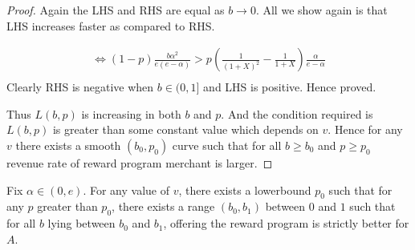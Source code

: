 \begin{proof}
Again the LHS and RHS are equal as $b\rightarrow 0$. All we show again is that LHS increases faster as compared to RHS.

\begin{align*}
\Leftrightarrow (1-p)\frac{b\alpha^2}{e(e-\alpha)} > p\left(\frac{1}{(1+X)^2} - \frac{1}{1+X} \right)\frac{\alpha}{e-\alpha}\\
\end{align*}
Clearly RHS is negative when $b\in (0,1]$ and LHS is positive. Hence proved.

Thus $L(b,p)$ is increasing in both $b$ and $p$. And the condition required is $L(b,p)$ is greater than some constant value which depends on $v$.
Hence for any $v$ there exists a smooth $(b_0,p_0)$ curve such that for all $b\ge b_0$ and $p\ge p_0$ revenue rate of reward program merchant is larger.

\end{proof}

\begin{theorem}
Fix $\alpha \in (0, e)$. 
For any value of $v$, there exists a lowerbound $p_0$ such that for any $p$ greater than $p_0$, there exists a range $(b_0, b_1)$ between $0$ and $1$ such that for all $b$ lying between $b_0$ and $b_1$, offering the reward program is strictly better for $A$. 
\end{theorem}



